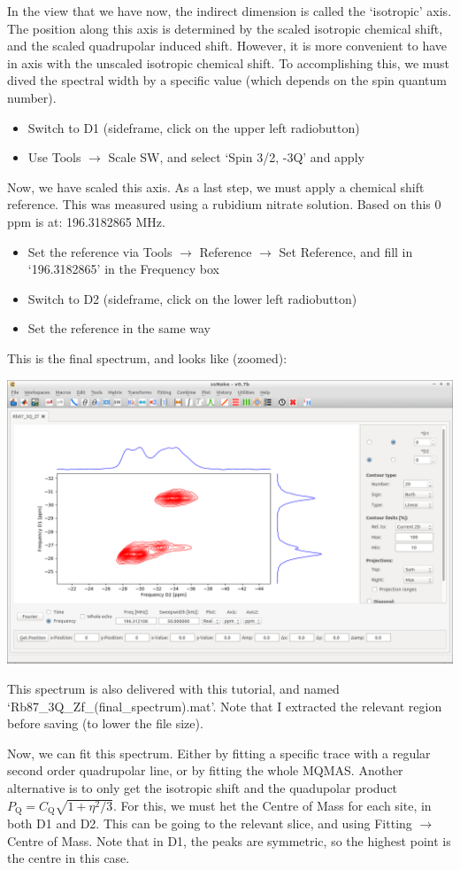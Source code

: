 \documentclass[11pt,a4paper]{article}
\begin{document}
In the view that we have now, the indirect dimension is called the `isotropic' axis. The position
along this axis is determined by the scaled isotropic chemical shift, and the scaled quadrupolar
induced shift. However, it is more convenient to have in axis with the unscaled isotropic chemical
shift. To accomplishing this, we must dived the spectral width by a specific value (which depends on
the spin quantum number).
\begin{itemize}
	\item Switch to D1 (sideframe, click on the upper left radiobutton)
	\item Use Tools  $\longrightarrow$ Scale SW, and select `Spin 3/2, -3Q' and apply
\end{itemize}
Now, we have scaled this axis. As a last step, we must apply a chemical shift reference. This was
measured using a rubidium nitrate solution. Based on this 0 ppm is at: 196.3182865 MHz.
\begin{itemize}
  \item Set the reference via Tools $\longrightarrow$ Reference $\longrightarrow$ Set Reference, and
	 fill in `196.3182865' in the Frequency box
	\item Switch to D2 (sideframe, click on the lower left radiobutton)
	\item Set the reference in the same way
\end{itemize}
This is the final spectrum, and looks like (zoomed):
\begin{center}
\includegraphics[width=0.8\linewidth]{Figs/Fig8.png}
\end{center}
This spectrum is also delivered with this tutorial, and named `Rb87\_3Q\_Zf\_(final\_spectrum).mat'.
Note that I extracted the relevant region before saving (to lower the file size).
 
Now, we can fit this spectrum. Either by fitting a specific trace with a regular second order
quadrupolar line, or by fitting the whole MQMAS. Another alternative is to only get the isotropic
shift and the quadupolar product $P_\text{Q} = C_\text{Q}\sqrt{1+\eta^2/3}$. For this, we must het
the Centre of Mass for each site, in both D1 and D2. This can be going to the relevant slice,
and using Fitting  $\longrightarrow$ Centre of Mass. Note that in D1, the peaks are symmetric, so the highest
point is the centre in this case.
\end{document}
